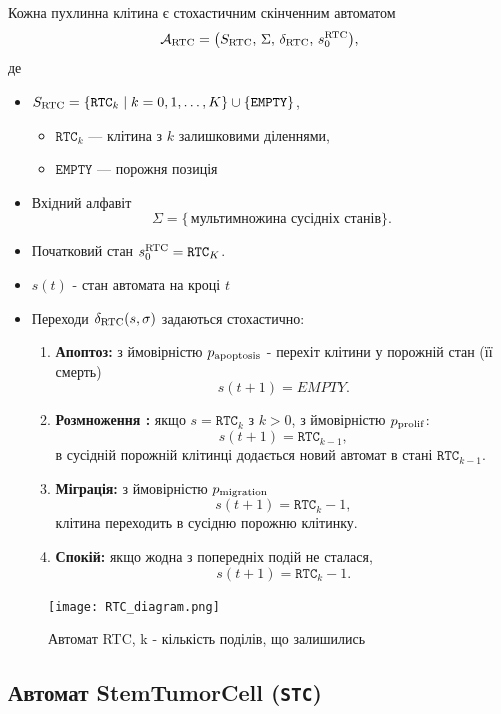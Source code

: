 \documentclass[12pt]{article}
\begin{document}
Кожна пухлинна клітина є стохастичним скінченним автоматом
\[
\mathcal{A}_{\rm RTC} = \bigl(S_{\rm RTC},\,\Sigma,\,\delta_{\rm RTC},\,s_0^{\rm RTC}\bigr),
\]
де
\begin{itemize}
  \item $S_{\rm RTC} = \{\mathtt{RTC}_k \mid k=0,1,\dots,K\}\cup\{\mathtt{EMPTY}\}$,  
    \begin{itemize}
      \item $\mathtt{RTC}_k$ — клітина з $k$ залишковими діленнями,
      \item $\mathtt{EMPTY}$ — порожня позиція
    \end{itemize}
  \item Вхідний алфавіт 
    \[
      \Sigma = \bigl\{\,\text{мультимножина сусідніх станів}\bigr\}.
    \]
  \item Початковий стан $s_0^{\rm RTC} = \mathtt{RTC}_{K}$.
  \item $s(t)$ - стан автомата на кроці $t$ 
  \item Переходи $\delta_{\rm RTC}(s,\sigma)$ задаються стохастично:
    \begin{enumerate}
      \item {\bfseries Апоптоз:}  
      з ймовірністю $p_{\rm apoptosis}$ - перехіт клітини у порожній стан (її смерть)
      \[
        s(t+1) = EMPTY.
      \]
      \item {\bfseries Розмноження :}  
      якщо $s=\mathtt{RTC}_k$ з $k>0$, з ймовірністю $p_{\rm prolif}$:
      \[
        s(t+1)=\mathtt{RTC}_{k-1},
      \] в сусідній порожній клітинці додається новий автомат в стані $\mathtt{RTC}_{k-1}$.
      \item {\bfseries Міграція:}  
      з ймовірністю $p_{\rm migration}$  
      \[
        s(t+1)=\mathtt{RTC}_k-1,
      \] клітина переходить в сусідню порожню клітинку.
      \item {\bfseries Спокій:}  
      якщо жодна з попередніх подій не сталася,  
      \[
        s(t+1)=\mathtt{RTC}_k-1.
      \]
    \end{enumerate}
\end{itemize}
\begin{figure}[h] %
    \centering
    \texttt{[image: RTC\_diagram.png]} %
    \caption{Автомат RTC, k - кількість поділів, що залишились}
    \label{fig:example}
\end{figure}

\subsection{Автомат StemTumorCell (\texttt{STC})}
\end{document}
